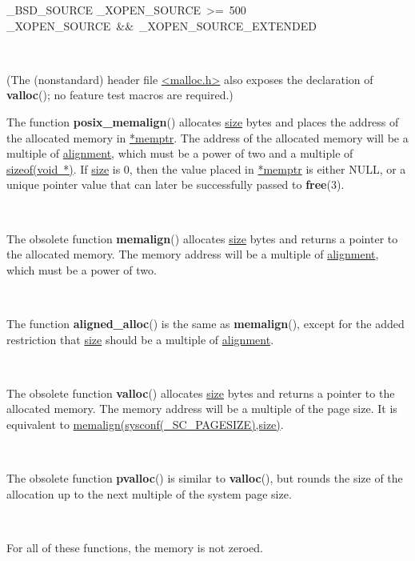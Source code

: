 \documentclass[]{article}
\let\realtextbf=\textbf
\renewcommand{\textbf}[1]{\textcolor{boldcolor}{\realtextbf{#1}}}
\renewcommand{\emph}[1]{\underline{#1}}
\begin{document}
\begin{description}
\itemsep1pt\parskip0pt
\item[Before glibc 2.12:]
\_BSD\_SOURCE \textbar{}\textbar{} \_XOPEN\_SOURCE~\textgreater{}=~500
\textbar{}\textbar{} \_XOPEN\_SOURCE~\&\&~\_XOPEN\_SOURCE\_EXTENDED

~

(The (nonstandard) header file \emph{\textless{}malloc.h\textgreater{}}
also exposes the declaration of \textbf{valloc}(); no feature test
macros are required.)
\end{description}


The function \textbf{posix\_memalign}() allocates \emph{size} bytes and
places the address of the allocated memory in \emph{*memptr}. The
address of the allocated memory will be a multiple of \emph{alignment},
which must be a power of two and a multiple of \emph{sizeof(void~*)}. If
\emph{size} is 0, then the value placed in \emph{*memptr} is either
NULL, or a unique pointer value that can later be successfully passed to
\textbf{free}(3).

~

The obsolete function \textbf{memalign}() allocates \emph{size} bytes
and returns a pointer to the allocated memory. The memory address will
be a multiple of \emph{alignment}, which must be a power of two.

~

The function \textbf{aligned\_alloc}() is the same as
\textbf{memalign}(), except for the added restriction that \emph{size}
should be a multiple of \emph{alignment}.

~

The obsolete function \textbf{valloc}() allocates \emph{size} bytes and
returns a pointer to the allocated memory. The memory address will be a
multiple of the page size. It is equivalent to
\emph{memalign(sysconf(\_SC\_PAGESIZE),size)}.

~

The obsolete function \textbf{pvalloc}() is similar to
\textbf{valloc}(), but rounds the size of the allocation up to the next
multiple of the system page size.

~

For all of these functions, the memory is not zeroed.
\end{document}
